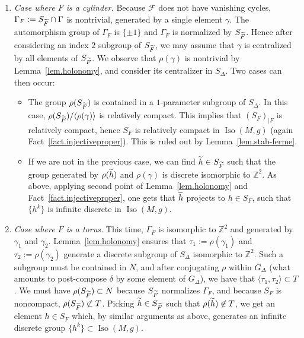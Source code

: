 \documentclass[11pt]{article}
\theoremstyle{definition}
\numberwithin{equation}{section}
\numberwithin{figure}{section}
\numberwithin{table}{section}
\DeclareMathOperator{\Iso}{Iso}
\newcommand{\calf}{\mathcal{F}}
\newcommand{\tF}{\tilde{{F}}}
\newcommand{\tth}{\tilde{h}}
\newcommand*\ZZ{\mathbb{Z}}
\let\oldtilde\tilde
\renewcommand*\tilde[1]{\mathchoice{\widetilde{#1}}{\widetilde{#1}}{\widetilde{#1}}{\oldtilde{#1}}}
\begin{document}
\begin{enumerate}
\item \label{listprf8.15.b}\emph{Case where $F$ is a cylinder.} Because $\calf$ does not have vanishing cycles, $\Gamma_F:=S_{\tF} \cap \Gamma$ is nontrivial, generated by a single element ${\gamma}$. The automorphism group of $\Gamma_F$ is $\{ \pm 1\}$ and $\Gamma_F$ is normalized by $S_{\tF}$. Hence after considering an index $2$ subgroup of $S_{\tF}$, we may assume that $\gamma$ is centralized by all elements of $S_{\tF}$. We observe that $\rho(\gamma)$ is nontrivial by Lemma~\ref{lem.holonomy}, and consider its centralizer in $S_{\Delta}$. Two cases can then occur:
\begin{itemize}
\item \label{listprf8.15.b.1}The group $\rho(S_{\tF})$ is contained in a $1$-parameter subgroup of $S_{\Delta}$. In this case, $\rho(S_{\tF})/\langle\rho(\gamma)\rangle$ is relatively compact. This implies that $(S_F)_{|F}$ is relatively compact, hence $S_F$ is relatively compact in $\Iso(M,g)$ (again Fact~\ref{fact.injectiveproper}). This is ruled out by Lemma~\ref{lem.stab-ferme}.
\item \label{listprf8.15.b.2}If we are not in the previous case, we can find $\tth \in S_{\tF}$ such that the group generated by $\rho(\tth)$ and $\rho(\gamma)$ is discrete isomorphic to $\ZZ^2$. As above, applying second point of Lemma~\ref{lem.holonomy} and Fact~\ref{fact.injectiveproper}, one gets that $\tth$ projects to $h \in S_F$, such that $\{ h^k \}$ is infinite discrete in $\Iso(M,g)$.
\end{itemize}
\item \label{listprf8.15.c}\emph{Case where $F$ is a torus.} This time, $\Gamma_{F}$ is isomorphic to $\ZZ^2$ and generated by $\gamma_1$ and $\gamma_2$. Lemma~\ref{lem.holonomy} ensures that $\tau_1:=\rho(\gamma_1)$ and $\tau_2:=\rho(\gamma_2)$ generate a discrete subgroup of $S_{\Delta}$ isomorphic to $\ZZ^2$. Such a subgroup must be contained in $N$, and after conjugating $\rho$ within $G_{\Delta}$ (what amounts to post-compose $\delta$ by some element of $G_{\Delta}$), we have that $\langle\tau_1,\tau_2\rangle \subset T$. We must have $\rho(S_{\tF}) \subset N$ because $S_{\tF}$ normalizes $\Gamma_F$, and because $S_F$ is noncompact, $\rho(S_{\tF}) \not \subset T$. Picking $\tth \in S_{\tF}$ such that $\rho(\tth) \not \in T$, we get an element $h \in S_F$ which, by similar arguments as above, generates an infinite discrete group $\{ h^k \} \subset \Iso(M,g)$.
\end{enumerate}
\end{document}
